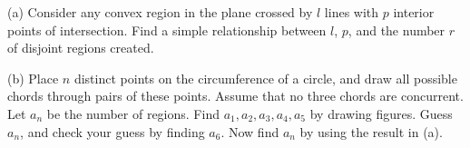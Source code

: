 (a) Consider any convex region in the plane crossed by $l$ lines with $p$ interior points of intersection. Find a simple relationship between $l$, $p$, and the number $r$ of disjoint regions created.

(b) Place $n$ distinct points on the circumference of a circle, and draw all possible chords through pairs of these points. Assume that no three chords are concurrent. Let $a_n$ be the number of regions. Find $a_1, a_2, a_3, a_4, a_5$ by drawing figures. Guess $a_n$, and check your guess by finding $a_6$. Now find $a_n$ by using the result in (a).
